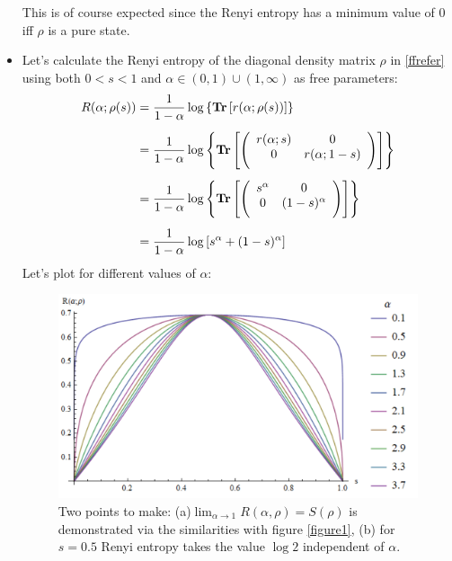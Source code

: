 \begin{itemize}
This is of course expected since the Renyi entropy has a minimum value of $0$ iff $\rho$ is a pure state. 
\item
Let's calculate the Renyi entropy of the diagonal density matrix $\rho$ in \eqref{ffrefer} using both $0<s<1$ and $\alpha \in(0,1) \cup(1, \infty)$ as free parameters:
\begin{align}
R(\alpha;\rho(s)) 
&= \frac{1}{1-\alpha} \log \left \{ \operatorname{\textup{\textbf{Tr}}} \left[ r(\alpha;\rho(s)) \right] \right\} \\[0.5em]
&= \frac{1}{1-\alpha} \log \left\{  \operatorname{\textup{\textbf{Tr}}} \left[ \left(
\begin{array}{cc}
 r(\alpha;s) & 0 \\
 0 & r(\alpha;1-s) \\[0.5em]
\end{array}
\right) \right] \right\}\\[0.5em]
&=
\frac{1}{1-\alpha} \log \left\{  \operatorname{\textup{\textbf{Tr}}} \left[ \left(
\begin{array}{cc}
 s^{\alpha} & 0 \\
 0 & (1-s)^{\alpha} \\[0.5em]
\end{array}
\right) \right] \right\} \\[0.5em] 
&=\frac{1}{1-\alpha}
\log \left[ s^{\alpha }+(1-s)^{\alpha } \right]
\end{align}
Let's plot for different values of $\alpha$:
\begin{figure}[H]
\label{figure3}
\begin{center}
\includegraphics[scale=0.8]{figures/renyi_ent_plot.png}
\caption{Two points to make: (a)$\lim_{\alpha \to 1}R(\alpha,\rho) = S(\rho)$ is demonstrated via the similarities with figure \ref{figure1}, (b) for $s=0.5$ Renyi entropy takes the value $\log2$ independent of $\alpha$.}
\end{center}

\end{figure}
\end{itemize}
